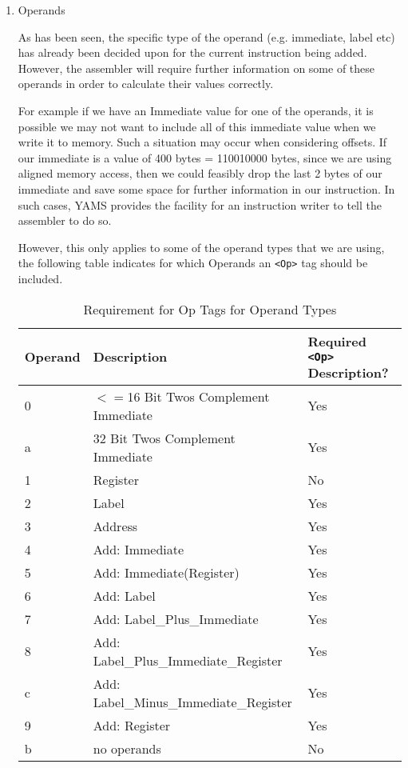 \begin{enumerate}
\begin{enumerate}
\item Operands

As has been seen, the specific type of the operand (e.g. immediate, label etc) has already been decided upon for the current instruction being added. However, the assembler will require further information on some of these operands in order to calculate their values correctly.

For example if we have an Immediate value for one of the operands, it is possible we may not want to include all of this immediate value when we write it to memory. Such a situation may occur when considering offsets. If our immediate is a value of 400 bytes = 110010000 bytes, since we are using aligned memory access, then we could feasibly drop the last 2 bytes of our immediate and save some space for further information in our instruction. In such cases, YAMS provides the facility for an instruction
writer to tell the assembler to do so.

However, this only applies to some of the operand types that we are using, the following table indicates for which Operands an \verb"<Op>" tag should be included.

\begin{table}[]
	\begin{tabular}{|l|l|p{1in}|}
	\hline
	Operand	&	Description	&	Required \verb"<Op>" Description? \\
	\hline
	0	&	$<=$16 Bit Twos Complement Immediate		&	Yes \\
	a	&	32 Bit Twos Complement Immediate			&	Yes \\
	1	&	Register									&	No \\
	2	&	Label										&	Yes \\
	3	&	Address										&	Yes \\
	4	&	Add: Immediate								&	Yes \\
	5	&	Add: Immediate(Register)					&	Yes \\
	6	&	Add: Label									&	Yes \\
	7	&	Add: Label\_Plus\_Immediate					&	Yes \\
	8	&	Add: Label\_Plus\_Immediate\_Register		&	Yes \\
	c	&	Add: Label\_Minus\_Immediate\_Register		&	Yes \\
	9	&	Add: Register								&	Yes \\
	b	&	no operands									&	No \\
	\hline
	\end{tabular}
\caption{Requirement for Op Tags for Operand Types}
\end{table}


\end{enumerate}
\end{enumerate}
